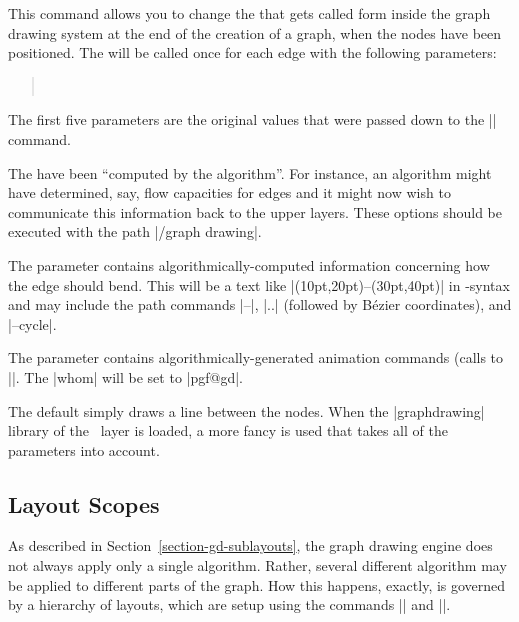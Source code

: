 \begin{command}{\pgfgdsetedgecallback{}}
    This command allows you to change the  that gets called form
    inside the graph drawing system at the end of the creation of a graph, when
    the nodes have been positioned. The  will be called once for
    each edge with the following parameters:
    \begin{quote}
        \\
    \end{quote}

    The first five parameters are the original values that were passed down to
    the |\pgfgdedge| command.

    The  have been ``computed by the
    algorithm''. For instance, an algorithm might have determined, say, flow
    capacities for edges and it might now wish to communicate this information
    back to the upper layers. These options should be executed with the path
    |/graph drawing|.

    The parameter  contains algorithmically-computed
    information concerning how the edge should bend. This will be a text like
    |(10pt,20pt)--(30pt,40pt)| in \tikzname-syntax and may include the path
    commands |--|,  |..| (followed by Bézier coordinates), and |--cycle|.

    The parameter  contains algorithmically-generated
    animation commands (calls to |\pgfanimateattribute|. The |whom| will be set
    to |pgf@gd|.

    The default  simply draws a line between the nodes. When the
    |graphdrawing| library of the \tikzname\ layer is loaded, a more fancy
     is used that takes all of the parameters into account.
\end{command}


\subsection{Layout Scopes}
\label{section-gd-layout-scopes}

As described in Section~\ref{section-gd-sublayouts}, the graph drawing engine
does not always apply only a single algorithm. Rather, several different
algorithm may be applied to different parts of the graph. How this happens,
exactly, is governed by a hierarchy of layouts, which are setup using the
commands |\pgfgdbeginlayout| and |\pgfgdendlayout|.

